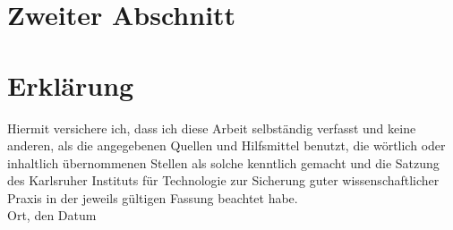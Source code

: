 \documentclass[12pt,a4paper]{scrartcl}
\numberwithin{equation}{section}
\begin{document}
\section{Zweiter Abschnitt}

  \newpage

\begin{thebibliography}{Lam00}
 
\end{thebibliography}
 
      

\newpage
  
 \thispagestyle{empty}


\vspace*{8cm}


\section*{Erklärung}

Hiermit versichere ich, dass ich diese Arbeit selbständig verfasst und keine anderen, als die angegebenen Quellen und Hilfsmittel benutzt, die wörtlich oder inhaltlich übernommenen Stellen als solche kenntlich gemacht und die Satzung des Karlsruher Instituts für Technologie zur Sicherung guter wissenschaftlicher Praxis in der jeweils gültigen Fassung beachtet habe. \\[2ex] 

\noindent
Ort, den Datum\\[5ex]

\end{document}
